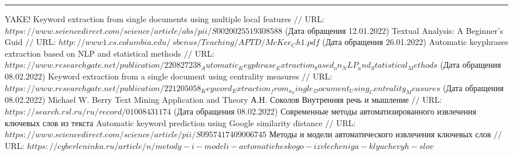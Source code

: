\makeatletter \renewcommand{} \makeatother
\renewcommand\refname{Список использованных источников}
\begin{thebibliography}{00}
	\hrule
	
	YAKE! Keyword extraction from single documents using multiple local features $//$ URL: $https://www.sciencedirect.com/science/article/abs/pii/S0020025519308588$ (Дата обращения 12.01.2022)
	Textual Analysis: A Beginner's Guid  $//$ URL: $http://www1.cs.columbia.edu/~sbenus/Teaching/APTD/McKee_Ch1.pdf$ (Дата обращения 26.01.2022)
	Automatic keyphrases extraction based on NLP  and statistical methods $//$ URL: $https://www.researchgate.net/publication/220827238_Automatic_Keyphrase_Extraction_based_on_NLP_and_Statistical_Methods$ (Дата обращения 08.02.2022)
	Keyword extraction from a single document using centrality measures $//$
	URL: $https://www.researchgate.net/publication/221205058_Keyword_Extraction_from_a_Single_Document_Using_Centrality_Measures$ (Дата обращения 08.02.2022)
	Michael W. Berry Text Mining Application and Theory
	А.Н. Соколов Внутренняя речь и мышление $//$ URL: $https://search.rsl.ru/ru/record/01008431174$ (Дата обращения 08.02.2022)
	Современные методы автоматизированного извлечения ключевых слов из текста
	Automatic keyword prediction using Google similarity distance $//$ URL: $https://www.sciencedirect.com/science/article/pii/S0957417409006745$
	Методы и модели автоматического извлечения ключевых слов $//$ URL: $https://cyberleninka.ru/article/n/metody-i-modeli-avtomaticheskogo-izvlecheniya-klyuchevyh-slov$

\end{thebibliography}
